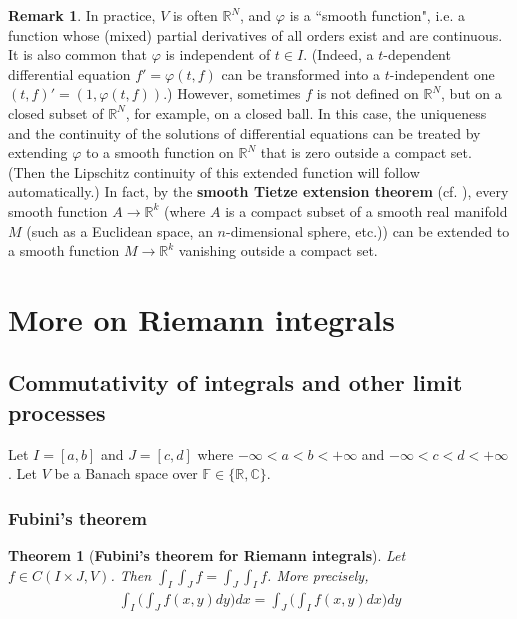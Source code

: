 \documentclass[12pt,b5paper,notitlepage]{article}
\theoremstyle{definition}
\newtheorem{rem}[df]{Remark}
\theoremstyle{plain}
\newtheorem{thm}[df]{Theorem}
\newcommand{\Cbb}{\mathbb C}
\newcommand{\Rbb}{\mathbb R}
\newcommand{\Fbb}{\mathbb F}
\numberwithin{equation}{section}
\begin{document}
\begin{rem}
In practice, $V$ is often $\Rbb^N$, and $\varphi$ is a ``smooth function", i.e. a function whose (mixed) partial derivatives of all orders exist and are continuous. It is also common that $\varphi$ is independent of $t\in I$. (Indeed, a $t$-dependent differential equation $f'=\varphi(t,f)$ can be transformed into a $t$-independent one $(t,f)'=(1,\varphi(t,f))$.) However, sometimes $f$ is not defined on $\Rbb^N$, but on a closed subset of $\Rbb^N$, for example, on a closed ball. In this case, the uniqueness and the continuity of the solutions of differential equations can be treated by extending $\varphi$ to a smooth function on $\Rbb^N$ that is zero outside a compact set. (Then the Lipschitz continuity of this extended function will follow automatically.) In fact, by the \textbf{smooth Tietze extension theorem} (cf. \cite[Lem. 2.26]{Lee}), every smooth function $A\rightarrow\Rbb^k$ (where $A$ is a compact subset of a smooth real manifold $M$ (such as a Euclidean space, an $n$-dimensional sphere, etc.)) can be extended to a smooth function $M\rightarrow\Rbb^k$ vanishing outside a compact set. 
\end{rem}


\newpage




\section{More on Riemann integrals}


\subsection{Commutativity of integrals and other limit processes}


Let $I=[a,b]$ and $J=[c,d]$ where $-\infty<a<b<+\infty$ and $-\infty<c<d<+\infty$. Let $V$ be a Banach space over $\Fbb\in\{\Rbb,\Cbb\}$.


\subsubsection{Fubini's theorem}


\begin{thm}[\textbf{Fubini's theorem for Riemann integrals}] \label{lb399} 
Let $f\in C(I\times J,V)$. Then $\int_I\int_Jf=\int_J\int_If$. More precisely,
\begin{align}
\int_I\Big(\int_Jf(x,y)dy\Big)dx=\int_J\Big(\int_I f(x,y)dx\Big)dy
\end{align}
\end{thm}
\end{document}
